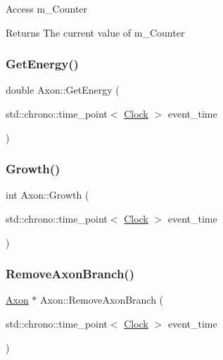 Access m\+\_\+\+Counter \begin{DoxyReturn}{Returns}
The current value of m\+\_\+\+Counter 
\end{DoxyReturn}
\mbox{\label{classAxon_a37a1ca2b0454d77dc0bc93e493feb0ce}} 
\subsubsection{\texorpdfstring{Get\+Energy()}{GetEnergy()}}
{\footnotesize\ttfamily double Axon\+::\+Get\+Energy (\begin{DoxyParamCaption}\item[{std\+::chrono\+::time\+\_\+point$<$ \mbox{\hyperlink{universe_8h_a0ef8d951d1ca5ab3cfaf7ab4c7a6fd80}{Clock}} $>$}]{event\+\_\+time }\end{DoxyParamCaption})\hspace{0.3cm}{\ttfamily [inline]}}

\mbox{\label{classAxon_a0065c335bc57e0a75962bcbd91f35001}} 
\subsubsection{\texorpdfstring{Growth()}{Growth()}}
{\footnotesize\ttfamily int Axon\+::\+Growth (\begin{DoxyParamCaption}\item[{std\+::chrono\+::time\+\_\+point$<$ \mbox{\hyperlink{universe_8h_a0ef8d951d1ca5ab3cfaf7ab4c7a6fd80}{Clock}} $>$}]{event\+\_\+time }\end{DoxyParamCaption})}

\mbox{\label{classAxon_a7b43ca7f5b696c72ac17a27fea3b2822}} 
\subsubsection{\texorpdfstring{Remove\+Axon\+Branch()}{RemoveAxonBranch()}}
{\footnotesize\ttfamily \mbox{\hyperlink{classAxon}{Axon}} $\ast$ Axon\+::\+Remove\+Axon\+Branch (\begin{DoxyParamCaption}\item[{std\+::chrono\+::time\+\_\+point$<$ \mbox{\hyperlink{universe_8h_a0ef8d951d1ca5ab3cfaf7ab4c7a6fd80}{Clock}} $>$}]{event\+\_\+time }\end{DoxyParamCaption})}

